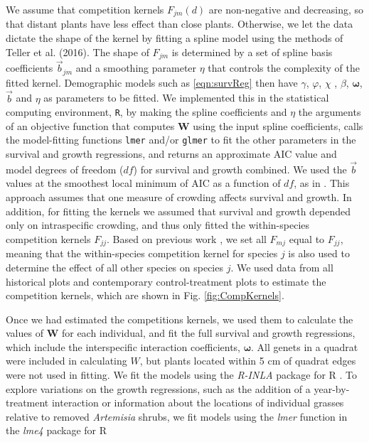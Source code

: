 \documentclass[11pt]{article}
\begin{document}
\begin{doublespacing}
We assume that competition kernels $F_{jm}(d)$ are non-negative and decreasing, so that distant plants have less effect 
than close plants. Otherwise, we let the data dictate the shape of the kernel by fitting a spline model 
using the methods of Teller et al. (2016). The shape of $F_{jm}$ is determined by a set of spline basis coefficients $\vec{b}_{jm}$
and a smoothing parameter $\eta$ that controls the complexity of the fitted kernel. 
Demographic models such as \eqref{eqn:survReg} then have $\gamma$, $\varphi$, $\chi$ , 
$\beta$, $\boldsymbol{\omega}$, $\vec{b}$ and $\eta$ as parameters to be fitted. We implemented this in the statistical computing environment, \texttt{R}, 
by making the spline coefficients and $\eta$ the arguments of an objective function that computes $\boldsymbol{W}$ using the input spline coefficients, 
calls the model-fitting functions \texttt{lmer} and/or \texttt{glmer} to fit the other parameters in the survival and growth regressions, 
and returns an approximate AIC value and model degrees of freedom ($df$) for survival and growth combined. We used the $\vec{b}$ values at the smoothest 
local minimum of AIC as a function of $df$, as in \cite{teller_linking_2016}. This approach assumes that one measure of crowding affects 
survival and growth. In addition, for fitting the kernels we assumed that survival and growth depended only on intraspecific crowding, and thus only fitted the
within-species competition kernels $F_{jj}$. Based on previous work \citep{adler_coexistence_2010}, we set all $F_{mj}$ equal to $F_{jj}$, meaning that 
the within-species competition kernel for species $j$ is also used to determine the effect of all other species on species $j$. We used data from all historical plots and contemporary control-treatment plots to estimate the competition kernels, which are shown in Fig. \ref{fig:CompKernels}. 

Once we had estimated the competitions kernels, we used them to calculate the values of $\boldsymbol{W}$ for each individual, 
and fit the full survival and growth regressions, which include the interspecific interaction coefficients, $\boldsymbol{\omega}$. 
All genets in a quadrat were included in calculating $W$, but plants located within 5 cm of quadrat edges were not used in fitting. 
We fit the models using the \textit{R-INLA} package for R \citep{rue_approximate_2009}. To explore variations on the growth regressions, such as the addition of a year-by-treatment interaction or information about the locations of individual grasses relative to removed \textit{Artemisia} shrubs, we fit models using the \textit{lmer} function in the \textit{lme4} package for R


\end{doublespacing}
\end{document}
